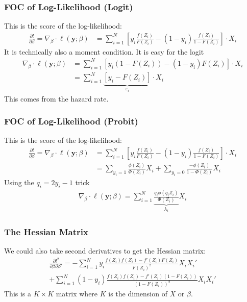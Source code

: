 \documentclass[aspectratio=169,11pt]{beamer}
\begin{document}
\begin{frame}
\frametitle{FOC of Log-Likelihood (Logit)}
This is the \alert{score} of the log-likelihood:
\begin{align*}
\frac{\partial l }{\partial \beta} = \nabla_{\beta} \cdot \ell(\symbf{y}; \beta) &=  \sum_{i=1}^N  \left[ y_i \frac{ f(Z_i) }{ F(Z_i)}  -  (1-y_i) \frac{f(Z_i) }{1-F(Z_i)} \right]  \cdot X_i 
\end{align*}
It is technically also a \alert{moment condition}. It is easy for the logit
\begin{align*}
 \nabla_{\beta} \cdot \ell(\symbf{y}; \beta) &=  \sum_{i=1}^N  \left[ y_i (1-F(Z_i)) -  (1-y_i) F(Z_i) \right] \cdot X_i \\
 &=  \sum_{i=1}^N  \underbrace{\left[ y_i - F(Z_i) \right]}_{\varepsilon_i} \cdot X_i 
\end{align*}
This comes from the hazard rate.
\end{frame}

\begin{frame}
\frametitle{FOC of Log-Likelihood (Probit)}
This is the \alert{score} of the log-likelihood:
\begin{align*}
\frac{\partial l }{\partial \beta} = \nabla_{\beta} \cdot \ell(\symbf{y}; \beta) &=  \sum_{i=1}^N  \left[ y_i \frac{ f(Z_i) }{ F(Z_i)}  -  (1-y_i) \frac{f(Z_i) }{1-F(Z_i)} \right] \cdot X_i  \\
 &=  \sum_{y_i=1}  \frac{\phi(Z_i) }{ \Phi(Z_i)} X_i +\sum_{y_i=0} \frac{-\phi(Z_i) }{1-\Phi(Z_i)} X_i
\end{align*}
Using the $q_i = 2 y_i -1$ trick
\begin{align*}
\nabla_{\beta} \cdot \ell(\symbf{y}; \beta)= \sum_{i=1}^N \underbrace{\frac{ q_i \phi(q_i Z_i)}{\Phi(Z_i)}}_{\lambda_i} X_i
\end{align*}
\end{frame}


\begin{frame}
\frametitle{The Hessian Matrix}
We could also take second derivatives to get the \alert{Hessian} matrix:
\begin{align*}
\frac{\partial l^2 }{\partial \beta \partial \beta'} = - \sum_{i=1}^N   y_i \frac{ f(Z_i)  f(Z_i) - f'(Z_i) F(Z_i) }{ F(Z_i)^2}  X_i X_i' \\
+  \sum_{i=1}^N   (1-y_i) \frac{f(Z_i)f(Z_i) - f'(Z_i)(1-F(Z_i))}{(1-F(Z_i))^2}  X_i X_i'
\end{align*}
This is a $K\times K$ matrix where $K$ is the dimension of $X$ or $\beta$.
\end{frame}
\end{document}
